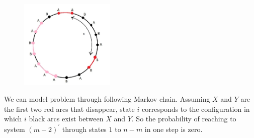 \documentclass[]{book}
\theoremstyle{definition}
\begin{document}
\begin{figure}[ht]
    \centering
    \includegraphics[width=0.4\textwidth]{figures/m.arcs.jpg}
    \caption{}
    \label{fig:mesh3}
\end{figure}


We can model problem through following Markov chain. Assuming $X$ and $Y$ are the first two red arcs that disappear, state $i$ corresponds to the configuration in which $i$ black arcs exist between $X$ and $Y$. So the probability of reaching to system $(m-2)^\prime$ through states $1$ to $n-m$ in one step is zero.
\end{document}

